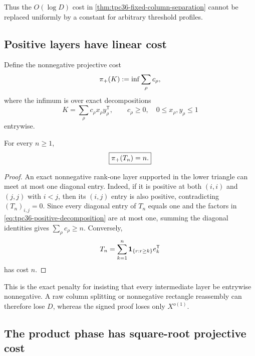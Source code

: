 Thus the \(O(\log D)\) cost in
\cref{thm:tpc36-fixed-column-separation} cannot be replaced uniformly by
a constant for arbitrary threshold profiles.

\subsection{Positive layers have linear cost}

Define the nonnegative projective cost
\begin{equation}
 \pi_{+}(K)
 :=\inf\sum_\rho c_\rho,
 \label{eq:tpc36-positive-projective-norm}
\end{equation}
where the infimum is over exact decompositions
\begin{equation}
 K=\sum_\rho c_\rho x_\rho y_\rho^{\mathsf T},
 \qquad
 c_\rho\ge0,\quad
 0\le x_\rho,y_\rho\le1
 \label{eq:tpc36-positive-decomposition}
\end{equation}
entrywise.

\begin{proposition}
\label{prop:tpc36-positive-Ferrers}
For every \(n\ge1\),
\begin{equation}
 \boxed{\pi_{+}(T_n)=n.}
 \label{eq:tpc36-positive-Ferrers-cost}
\end{equation}
\end{proposition}

\begin{proof}
An exact nonnegative rank-one layer supported in the lower triangle can
meet at most one diagonal entry.  Indeed, if it is positive at both
\((i,i)\) and \((j,j)\) with \(i<j\), then its \((i,j)\) entry is also
positive, contradicting \((T_n)_{i,j}=0\).  Since every diagonal entry of
\(T_n\) equals one and the factors in
\eqref{eq:tpc36-positive-decomposition} are at most one, summing the
diagonal identities gives \(\sum_\rho c_\rho\ge n\).  Conversely,
\begin{equation}
 T_n=\sum_{k=1}^n
 \mathbf 1_{\{r:r\ge k\}}e_k^{\mathsf T}
 \label{eq:tpc36-positive-column-decomposition}
\end{equation}
has cost \(n\).
\end{proof}

This is the exact penalty for insisting that every intermediate layer be
entrywise nonnegative.  A raw column splitting or nonnegative rectangle
reassembly can therefore lose \(D\), whereas the signed proof loses only
\(X^{o(1)}\).

\subsection{The product phase has square-root projective cost}

